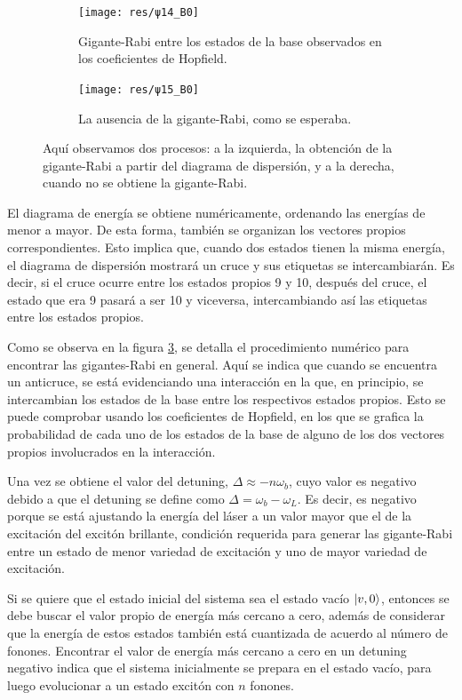 \documentclass[main.tex]{subfiles}
\begin{document}
\begin{figure}[htbp]
	\begin{subfigure}[b]{0.49\textwidth}
		\centering
		\texttt{[image: res/ψ14\_B0]}
		\caption{Gigante-Rabi entre los estados de la base observados en los coeficientes de Hopfield.}
		\label{fig:ψ14_B0}
	\end{subfigure}
	\hfill
	\begin{subfigure}[b]{0.49\textwidth}
		\centering
		\texttt{[image: res/ψ15\_B0]}
		\caption{La ausencia de la gigante-Rabi, como se esperaba.}
		\label{fig:ψ15_B0}
	\end{subfigure}
	\caption{Aquí observamos dos procesos: a la izquierda, la obtención de la gigante-Rabi a partir del diagrama de dispersión, y a la derecha, cuando no se obtiene la gigante-Rabi.}
	\label{fig:Vladimir}
\end{figure}

El diagrama de energía se obtiene numéricamente, ordenando las energías de menor a mayor. De esta forma, también se organizan los vectores propios correspondientes. Esto implica que, cuando dos estados tienen la misma energía, el diagrama de dispersión mostrará un cruce y sus etiquetas se intercambiarán. Es decir, si el cruce ocurre entre los estados propios 9 y 10, después del cruce, el estado que era 9 pasará a ser 10 y viceversa, intercambiando así las etiquetas entre los estados propios.

Como se observa en la figura \ref{fig:Vladimir}, se detalla el procedimiento numérico para encontrar las gigantes-Rabi en general. Aquí se indica que cuando se encuentra un anticruce, se está evidenciando una interacción en la que, en principio, se intercambian los estados de la base entre los respectivos estados propios. Esto se puede comprobar usando los coeficientes de Hopfield, en los que se grafica la probabilidad de cada uno de los estados de la base de alguno de los dos vectores propios involucrados en la interacción.

Una vez se obtiene el valor del detuning, $\Delta \approx -n\omega_b$, cuyo valor es negativo debido a que el detuning se define como $\Delta = \omega_b - \omega_L$. Es decir, es negativo porque se está ajustando la energía del láser a un valor mayor que el de la excitación del excitón brillante, condición requerida para generar las gigante-Rabi entre un estado de menor variedad de excitación y uno de mayor variedad de excitación.

Si se quiere que el estado inicial del sistema sea el estado vacío $\ket{v,0}$, entonces se debe buscar el valor propio de energía más cercano a cero, además de considerar que la energía de estos estados también está cuantizada de acuerdo al número de fonones. Encontrar el valor de energía más cercano a cero en un detuning negativo indica que el sistema inicialmente se prepara en el estado vacío, para luego evolucionar a un estado excitón con $n$ fonones.
\end{document}
